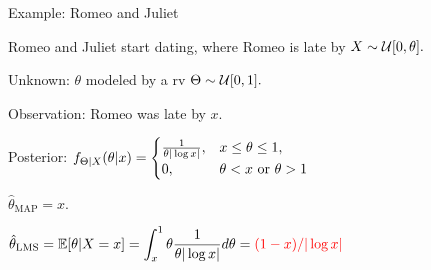 \begin{frame}{Example: Romeo and Juliet}

\hfill {}
  
\plitemsep 0.02in
\bci
\item<1-> Romeo and Juliet start dating, where 
Romeo is late by $X \sim \mathcal U[0,\theta].$
\item<1-> Unknown: $\theta$ modeled by a rv $\Theta \sim \mathcal U[0,1].$
\item<1-> Observation: Romeo was late by $x.$
  
\item<2-> Posterior:    $
    \displaystyle
     f_{\Theta|X}(\theta|x) = 
      \begin{cases}
        \frac{1}{\theta |\log x|},&  x \le \theta \le 1, \cr
        0, & \theta < x \text{ or } \theta >1
      \end{cases}
      $

      {
        \small
        \plitemsep 0.05in
        \bci
        
      \item<2-> $\hat{\theta}_{\text{MAP}} = x.$
        
      \item<3-> 


        $\displaystyle \hat{\theta}_{\text{LMS}} = \mathbb{E}[ \theta | X=x ] = \int_{x}^1 \theta \frac{1}{\theta |\log x|} d\theta        = {\color{red} (1-x)/|\log x|}$
        \eci
      }
      {
      }
      
      
      



\eci

\end{frame}




